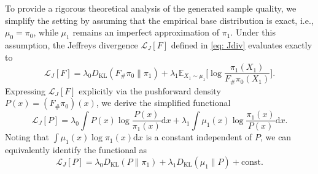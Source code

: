\documentclass[%
 reprint,
 amsmath,amssymb,
 aps,
 pre,
]{revtex4-2}
\DeclareMathOperator{\KL}{KL}
\newcommand{\D}{\mathrm{d}}
\begin{document}
To provide a rigorous theoretical analysis of the generated sample quality, we simplify the setting by assuming that the empirical base distribution is exact, i.e., $\mu_0 = \pi_0$, while $\mu_1$ remains an imperfect approximation of $\pi_1$. Under this assumption, the Jeffreys divergence $\mathcal L_J[F]$ defined in \eqref{eq: Jdiv} evaluates exactly to
\begin{equation*}
	\mathcal L_J[F] = \lambda_0 D_{\KL}(F_\#\pi_0\|\pi_1) + 
	\lambda_1 \mathbb E_{X_1\sim \mu_1} 
	\bigg[\log\frac{\pi_1(X_1)}{F_\#\pi_0(X_1)}\bigg].
\end{equation*}
Expressing $\mathcal L_J[F]$ explicitly via the pushforward density $P(x) = (F_\#\pi_0)(x)$, we derive the simplified functional
\begin{equation*}
	\mathcal L_J[P] =  \lambda_0 \int P(x) \log \frac{P(x)}{\pi_1(x)}\D x + \lambda_1 \int \mu_1(x)\log \frac{\pi_1(x)}{P(x)}\D x.
\end{equation*}
Noting that $\int \mu_1(x) \log \pi_1(x)\D x$ is a constant independent of $P$, we can equivalently identify the functional as
\begin{equation}
	\mathcal L_J[P] = \lambda_0 D_{\KL}(P\|\pi_1) + \lambda_1 D_{\KL}(\mu_1\|P) + \mathrm{const}.
	\label{eq: LJP}
\end{equation}
\end{document}

